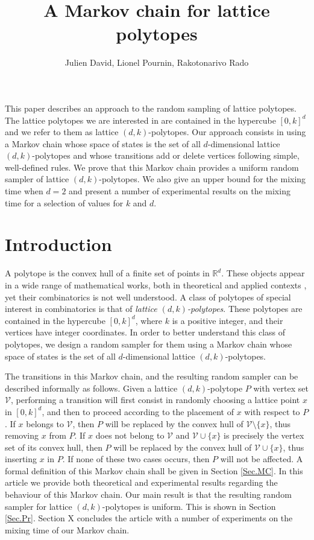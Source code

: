 \documentclass[a4paper]{article}
\begin{document}
\title{A Markov chain for lattice polytopes}
\author{Julien David, Lionel Pournin, Rakotonarivo Rado}
\maketitle

 This paper describes an approach to the random sampling of lattice polytopes. The lattice polytopes we are interested in are contained in the hypercube $[0,k]^d$ and we refer to them as lattice $(d, k)$-polytopes. Our approach consists in using a Markov chain whose space of states is the set of all $d$-dimensional lattice $(d,k)$-polytopes and whose transitions add or delete vertices following simple, well-defined rules. We prove that this Markov chain provides a uniform random sampler of lattice $(d, k)$-polytopes. We also give an upper bound for the mixing time when $d=2$ and present a number of experimental results on the mixing time for a selection of values for $k$ and $d$.

\section{Introduction}

A polytope is the convex hull of a finite set of points in $\mathbb{R}^d$. These objects appear in a wide range of mathematical works, both in theoretical and applied contexts \cite{ziegler1995lectures}, yet their combinatorics is not well understood. A class of polytopes of special interest in combinatorics is that of \emph{lattice $(d,k)$-polytopes}. These polytopes are contained in the hypercube $[0,k]^d$, where $k$ is a positive integer, and their vertices have integer coordinates. In order to better understand this class of polytopes, we design a random sampler for them using a Markov chain whose space of states is the set of all $d$-dimensional lattice $(d,k)$-polytopes.

The transitions in this Markov chain, and the resulting random sampler can be described informally as follows. Given a lattice $(d,k)$-polytope $P$ with vertex set $\mathcal{V}$, performing a transition will first consist in randomly choosing a lattice point $x$ in $[0,k]^d$, and then to proceed according to the placement of $x$ with respect to $P$. If $x$ belongs to $\mathcal{V}$, then $P$ will be replaced by the convex hull of $\mathcal{V}\mathord{\setminus}\{x\}$, thus removing $x$ from $P$. If $x$ does not belong to $\mathcal{V}$ and $\mathcal{V}\cup\{x\}$ is precisely the vertex set of its convex hull, then $P$ will be replaced by the convex hull of $\mathcal{V}\cup\{x\}$, thus inserting $x$ in $P$. If none of these two cases occurs, then $P$ will not be affected. A formal definition of this Markov chain shall be given in Section \ref{Sec.MC}. In this article we provide both theoretical and experimental results regarding the behaviour of this Markov chain. Our main result is that the resulting random sampler for lattice $(d, k)$-polytopes is uniform. This is shown in Section \ref{Sec.Pr}. Section X  concludes the article with a number of experiments on the mixing time of our Markov chain.
\end{document}
